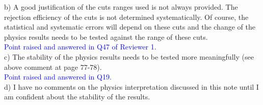  b) A good justification of the cuts ranges used is not always provided. The 
rejection efficiency of the cuts is not determined systematically. Of course, 
the statistical and systematic errors will depend on these cuts and the change 
of the physics results needs to be tested against the range of these cuts. \\
\textcolor{blue}{ Point raised and answered in Q47 of Reviewer 1. }\\

c) The stability of the physics results needs to be tested more meaningfully 
(see above comment at page 77-78).\\
\textcolor{blue}{ Point raised and answered in Q19.}\\

d) I have no comments on the physics interpretation discussed in this note 
until I am confident about the stability of the results.\\


\newpage
\newpage
\newpage
\newpage
\newpage
